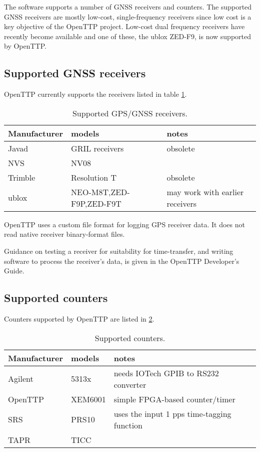 The software supports a number of GNSS receivers and counters. 
The supported GNSS receivers are mostly low-cost, single-frequency receivers
since low cost is a key objective of the OpenTTP project. 
Low-cost dual frequency receivers have recently become available and one of these,
the ublox ZED-F9, is now supported by OpenTTP.

	
	\subsection{Supported GNSS receivers}
	
	OpenTTP currently supports the receivers listed in table \ref{t:receivers}.
	
	\begin{table}[h]
	\begin{tabular}{lll}
	Manufacturer & models & notes \\ \hline
	Javad & GRIL receivers & obsolete \\
	NVS   & NV08 & \\
	Trimble & Resolution T & obsolete\\
	ublox & NEO-M8T,ZED-F9P,ZED-F9T & may work with earlier receivers\\
	\end{tabular}
	\caption{Supported GPS/GNSS receivers.\label{t:receivers}}
	\end{table}
	
	OpenTTP uses a custom file format for logging GPS receiver data. 
	It does not read native receiver binary-format files.
	
	Guidance on testing a receiver for suitability for time-transfer, and writing software to process
	the receiver's data, is given in the OpenTTP Developer's Guide.
	
	\subsection{Supported counters}
	
	Counters supported by OpenTTP are listed in \ref{t:counters}.
	
	\begin{table}[h]
	\begin{tabular}{lll}
	Manufacturer & models & notes \\ \hline
	Agilent & 5313x &  needs IOTech GPIB to RS232 converter\\
	OpenTTP & XEM6001 & simple FPGA-based counter/timer \\
	SRS & PRS10 & uses the input 1 pps time-tagging function\\
	TAPR & TICC &\\
	\end{tabular}
	\caption{Supported counters. \label{t:counters}}
	\end{table}
	
